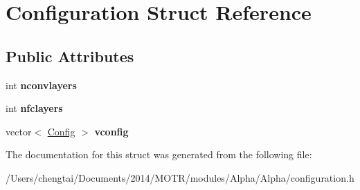 \hypertarget{struct_configuration}{\section{Configuration Struct Reference}
\label{struct_configuration}
}
\subsection*{Public Attributes}
\begin{DoxyCompactItemize}
\item 
\hypertarget{struct_configuration_a0a011834331cc1da7029d8b11f8234c8}{int {\bfseries nconvlayers}}\label{struct_configuration_a0a011834331cc1da7029d8b11f8234c8}

\item 
\hypertarget{struct_configuration_ad1f3df350b8795f714c10ef2c641bdb9}{int {\bfseries nfclayers}}\label{struct_configuration_ad1f3df350b8795f714c10ef2c641bdb9}

\item 
\hypertarget{struct_configuration_ae770a2fe69b45d01bb20597ee8f6898b}{vector$<$ \hyperlink{struct_config}{Config} $>$ {\bfseries vconfig}}\label{struct_configuration_ae770a2fe69b45d01bb20597ee8f6898b}

\end{DoxyCompactItemize}


The documentation for this struct was generated from the following file\+:\begin{DoxyCompactItemize}
\item 
/\+Users/chengtai/\+Documents/2014/\+M\+O\+T\+R/modules/\+Alpha/\+Alpha/configuration.\+h\end{DoxyCompactItemize}
